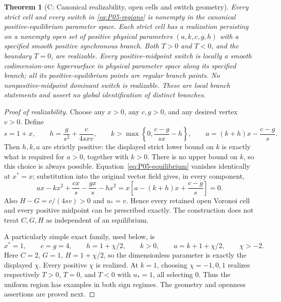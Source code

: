 \documentclass[11pt]{article}
\newtheorem{theorem}{Theorem}[section]
\theoremstyle{definition}
\theoremstyle{remark}
\begin{document}
\begin{theorem}[C: Canonical realizability, open cells and switch geometry]
\label{thm:P05-realization}
Every strict cell and every switch in \eqref{eq:P05-regions} is nonempty
in the canonical positive-equilibrium parameter space. Each strict cell
has a realization persisting on a nonempty open set of positive physical
parameters $(a,k,c,g,h)$ with a specified smooth positive synchronous
branch. Both $T>0$ and $T<0$, and the boundary $T=0$, are realizable.
Every positive-midpoint switch is locally a smooth codimension-one
hypersurface in physical parameter space along its specified branch;
all its positive-equilibrium points are regular branch points. No
nonpositive-midpoint dominant switch is realizable. These are local
branch statements and assert no global identification of distinct branches.
\end{theorem}
\begin{proof}[Proof of realizability]
Choose any $x>0$, any $c,g>0$, and any desired vertex $v>0$. Define
\begin{equation}
 s=1+x,\qquad h=\frac{g}{s^2}+\frac{c}{4sxv},\qquad
 k>\max\left\{0,\frac{c-g}{sx}-h\right\},\qquad
 a=(k+h)x-\frac{c-g}{s}.
 \label{eq:P05-construction}
\end{equation}
Then $h,k,a$ are strictly positive: the displayed strict lower bound on
$k$ is exactly what is required for $a>0$, together with $k>0$.
There is no upper bound on $k$, so this choice is always possible.
Equation~\eqref{eq:P05-equilibrium} vanishes identically at $x^*=x$;
substitution into the original vector field gives, in every component,
\[
 ax-kx^2+\frac{cx}{s}-\frac{gx}{s}-hx^2
 =x\left[a-(k+h)x+\frac{c-g}{s}\right]=0.
\]
Also $H-G=c/(4sv)>0$ and $u_*=v$. Hence every retained open
Voronoi cell and every positive midpoint can be prescribed exactly.
The construction does not treat $C,G,H$ as independent of an equilibrium.

A particularly simple exact family, used below, is
\begin{equation}
 x^*=1,\qquad c=g=4,\qquad h=1+\chi/2,\qquad
 k>0,\qquad a=k+1+\chi/2,\qquad \chi>-2.
 \label{eq:P05-simple-family}
\end{equation}
Here $C=2$, $G=1$, $H=1+\chi/2$, so the dimensionless parameter
is exactly the displayed $\chi$. Every positive $\chi$ is realized.
At $k=1$, choosing $\chi=-1,0,1$ realizes respectively $T>0$,
$T=0$, and $T<0$ with $u_*=1$, all selecting $0$.
Thus the uniform region has examples in both sign regimes.
The geometry and openness assertions are proved next.
\end{proof}
\end{document}
